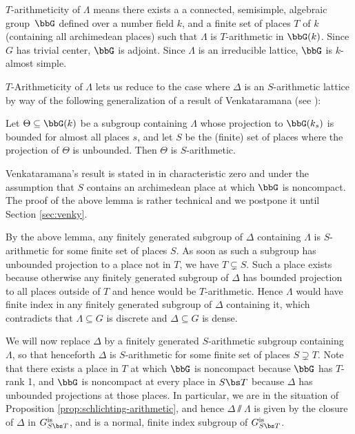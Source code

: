 $T$-arithmeticity of $\Lambda$ means there exists a a connected, semisimple, algebraic group~$\bbG$ defined over a number field $k$, and a finite set of places $T$ of $k$ (containing all archimedean places) such that $\Lambda$ is $T$-arithmetic in $\bbG(k)$. Since $G$ has trivial center, $\bbG$ is adjoint. Since $\Lambda$ is an irreducible lattice, $\bbG$ is $k$-almost simple.

$T$-Arithmeticity of $\Lambda$ lets us reduce to the case where $\Delta$ is an $S$-arithmetic lattice by way of the following generalization of a result of Venkataramana (see \cite[Prop.\,2.3]{lubotzky-zimmer}):
\begin{lemma}\label{lem:gen-venky}
Let $\Theta\subseteq \bbG(k)$ be a subgroup containing $\Lambda$ whose projection to $\bbG(k_s)$ is bounded for almost all places $s$, and let $S$ be the (finite) set of places where the projection of $\Theta$ is unbounded. Then $\Theta$ is $S$-arithmetic.
\end{lemma}
Venkataramana's result is stated in \cite{lubotzky-zimmer} in characteristic zero and under the assumption that $S$ contains an archimedean place at which $\bbG$ is noncompact. The proof of the above lemma is rather technical and we postpone it until Section \ref{sec:venky}.

\begin{rem}\label{rem:one-prime}
By the above lemma, any finitely generated subgroup of $\Delta$ containing $\Lambda$ is $S$-arithmetic for some finite set of places $S$. As soon as such a subgroup has unbounded projection to a place not in $T$, we have $T\subsetneq S$. Such a place exists because otherwise any finitely generated subgroup of $\Delta$ has bounded projection to all places outside of $T$ and hence would be $T$-arithmetic. Hence $\Lambda$ would have finite index in any finitely generated subgroup of $\Delta$ containing it, which contradicts that $\Lambda\subseteq G$ is discrete and $\Delta\subseteq G$ is dense.

We will now replace $\Delta$ by a finitely generated $S$-arithmetic subgroup containing~$\Lambda$, so that henceforth $\Delta$ is $S$-arithmetic for some finite set of places $S\supsetneq T$. Note that there exists a place in $T$ at which $\bbG$ is noncompact because $\bbG$ has $T$-rank 1, and $\bbG$ is noncompact at every place in $S\bs T$ because $\Delta$ has unbounded projections at those places. In particular, we are in the situation of Proposition \ref{prop:schlichting-arithmetic}, and hence $\Delta\sslash\Lambda$ is given by the closure of $\Delta$ in $G_{S\bs T}^{\textup{is}}$, and is a normal, finite index subgroup of $G_{S\bs T}^{\textup{is}}$.
\end{rem}

